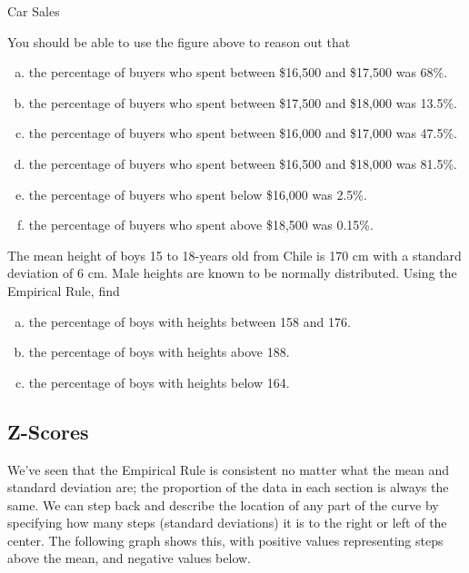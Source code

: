 \begin{example}[https://www.youtube.com/watch?v=E8rczzYhOL4&list=PLfmpjsIzhzttL_Uec2nCbDRcAcUF7NKG8&index=25]{Car Sales}
\begin{center}
\begin{tikzpicture}
\end{tikzpicture}
\end{center}

You should be able to use the figure above to reason out that
\begin{enumerate}[(a)]
\item the percentage of buyers who spent between \$16,500 and \$17,500 was 68\%.
\item the percentage of buyers who spent between \$17,500 and \$18,000 was 13.5\%.
\item the percentage of buyers who spent between \$16,000 and \$17,000 was 47.5\%.
\item the percentage of buyers who spent between \$16,500 and \$18,000 was 81.5\%.
\item the percentage of buyers who spent below \$16,000 was 2.5\%.
\item the percentage of buyers who spent above \$18,500 was 0.15\%.
\end{enumerate}
\end{example}

\begin{try}
The mean height of boys 15 to 18-years old from Chile is 170 cm with a standard deviation of 6 cm. Male heights are known to be normally distributed. Using the Empirical Rule, find
\begin{enumerate}[(a)]
\item the percentage of boys with heights between 158 and 176. 
\item the percentage of boys with heights above 188.
\item the percentage of boys with heights below 164.
\end{enumerate}
\end{try}
\vfill
\pagebreak

\subsection{Z-Scores}
We've seen that the Empirical Rule is consistent no matter what the mean and standard deviation are; the proportion of the data in each section is always the same.  We can step back and describe the location of any part of the curve by specifying how many steps (standard deviations) it is to the right or left of the center.  The following graph shows this, with positive values representing steps above the mean, and negative values below.

